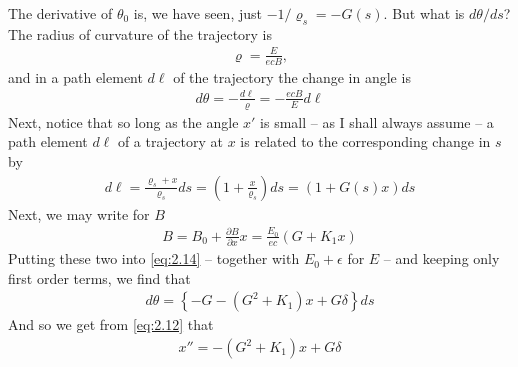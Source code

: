 The derivative of $\theta_0$ is, we have seen, just $-1/\varrho_s = -G(s)$. But what is $d\theta/ds$? The radius of curvature of the trajectory is
\begin{align} \label{eq:2.13}
	\varrho = \frac{E}{ecB},
\end{align}
and in a path element $d\ell$ of the trajectory the change in angle is
\begin{align}
	d\theta = -\frac{d\ell}{\varrho} = -\frac{ecB}{E}d\ell\label{eq:2.14}
\end{align}
Next, notice that so long as the angle $x'$ is small -- as I shall always assume --
a path element $d\ell$ of a trajectory at $x$ is related to the corresponding change in $s$ by
\begin{align}
	d\ell = \frac{\varrho_s + x}{\varrho_s} ds = \left(1+\frac{x}{\varrho_s}\right)ds = (1+G(s)x)ds\label{eq:2.15}
\end{align}
Next, we may write for $B$
\begin{align}
	B = B_0 + \frac{\partial B}{\partial x}x = \frac{E_0}{ec}(G+K_1x)\label{eq:2.16}
\end{align}
Putting these two into \eqref{eq:2.14} -- together with $E_0 + \epsilon$ for $E$ -- and keeping only first order terms, we find that
\begin{align*}
	d\theta = \left\{-G-(G^2+K_1)x + G\delta\right\}ds
\end{align*}
And so we get from \eqref{eq:2.12} that
\begin{align}\label{eq:2.17}
	x'' = -(G^ 2+K_1)x + G\delta
\end{align}

